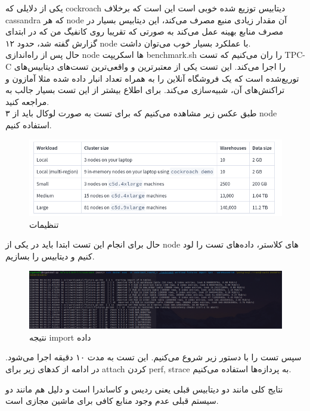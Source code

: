 \noindent
یکی از دلایلی که cockroach 
دیتابیس توزیع شده خوبی است این است که برخلاف cassandra 
که هر node آن مقدار
زیادی منبع مصرف می‌کند، این دیتابیس بسیار در مصرف منابع بهینه عمل می‌کند به صورتی که تقریبا روی کانفیگ من که در ابتدای گزارش گفته شد، حدود ۱۲ node با عملکرد بسیار خوب می‌توان داشت.
\\
حال پس از راه‌اندازی node ها اسکریپت benchmark.sh را ران می‌کنیم که 
تست TPC-C 
را اجرا می‌کند.
این تست یکی از معتبرترین و واقعی‌ترین تست‌های دیتابیس‌های توریع‌شده است که 
یک فروشگاه آنلاین را به همراه تعداد انبار داده شده مثلا آمازون و تراکنش‌های آن، شبیه‌سازی می‌کند.
برای اطلاع بیشتر از این تست بسیار جالب به 
مراجعه کنید.
\\
طبق عکس زیر مشاهده می‌کنیم که برای تست به صورت لوکال باید از ۳ 
node استفاده کنیم.
\\
\begin{figure}[H]
  \centering
  \includegraphics[scale=0.5]{pictures/cockroach/init/tpcc2.png}
  \caption{تنظیمات }
\end{figure}
حال برای انجام این تست ابتدا باید در یکی از node 
های کلاستر، داده‌های تست را لود کنیم و دیتابیس را بسازیم.
\\
\begin{figure}[H]
  \centering
  \includegraphics[scale=0.25]{pictures/cockroach/init/init-tpcc2.png}
  \caption{نتیجه import داده}
\end{figure}
سپس تست را با دستور زیر شروع می‌کنیم.
این تست به مدت ۱۰ دقیقه اجرا می‌شود.
در ادامه از کدهای زیر برای attach کردن perf, strace به پردازه‌ها استفاده می‌کنیم.

نتایج کلی مانند دو دیتابیس قبلی یعنی ردیس و کاساندرا است و دلیل هم مانند دو سیستم قبلی عدم وجود منابع کافی برای ماشین مجازی است.